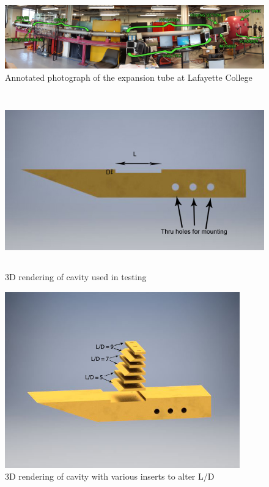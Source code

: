\begin{figure}
\centering
\includegraphics[width=\textwidth]{Figures/TubeLabeled.jpg}
\caption[Annotated Expansion Tube]{Annotated photograph of the expansion tube at Lafayette College}
\label{fig:tubelabeled}
\end{figure}

\begin{figure}
\centering
\includegraphics[height = 3in]{Figures/Cavitylabel.jpg}
\caption[Cavity 3D Model]{3D rendering of cavity used in testing}
\label{fig:cavModel}
\end{figure}

\begin{figure}
\centering
\includegraphics[height = 3in]{Figures/CavityInserts.jpg}
\caption[Cavity Model with Inserts]{3D rendering of cavity with various inserts to alter L/D}
\label{fig:cavInserts}
\end{figure}

